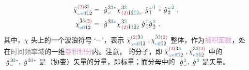 \begin{subequations} \label{eq:chieff}
\begin{align}
	\textcolor{gray}{\widetilde{\textcolor{black}{\chi}}}^{\textcolor{Maroon}{(2)} \hat{3} \textcolor{PineGreen}{\hat{3}}}_{\mathcolor{gray}{\omega} \textcolor{NavyBlue}{\text{eff}} \hat{1} \hat{2}} &= \Xint{{}^{}_{\mathcolor{gray}{-}}}{10}{\hat{g}}^{\;\! \hat{3} \textcolor{PineGreen}{\hat{3}} \textcolor{Plum}{*}}_{\;\! \mathcolor{gray}{\omega}} {\chi}^{\;\! \hat{3} \textcolor{PineGreen}{\hat{3}} }_{\;\! \textcolor{Maroon}{(2)} \hat{1} \hat{2} \textcolor{PineGreen}{\hat{1} \hat{2}} \mathcolor{gray}{\omega}} ~ {\hat{g}}^{\;\! \mathcolor{gray}{\omega} \textcolor{PineGreen}{\hat{1}}}_{\;\! \hat{1}} ~\mathcolor{gray}{\widetilde *}~ {\hat{g}}^{\;\! \mathcolor{gray}{\omega} \textcolor{PineGreen}{\hat{2}}}_{\;\! \hat{2}} ~, \label{eq:chieff-spectrum} \\
	{\chi}^{\hat{3} \textcolor{PineGreen}{\hat{3}} \textcolor{Maroon}{(2)} }_{\textcolor{NavyBlue}{\text{eff}} \hat{1} \hat{2}} &= \Xint{{}^{}_{\mathcolor{gray}{-}}}{10}{\hat{g}}^{\;\! \hat{3} \textcolor{PineGreen}{\hat{3}} \textcolor{Plum}{*}}_{\;\! } {\chi}^{\;\! \hat{3} \textcolor{PineGreen}{\hat{3}} }_{\;\! \textcolor{Maroon}{(2)} \hat{1} \textcolor{PineGreen}{\hat{1}} \hat{2} \textcolor{PineGreen}{\hat{2}}} ~ {\hat{g}}^{\;\! \textcolor{PineGreen}{\hat{1}}}_{\;\! \hat{1}}  {\hat{g}}^{\;\! \textcolor{PineGreen}{\hat{2}}}_{\;\! \hat{2}} ~, \label{eq:chieff-discrete}
\end{align}
\end{subequations}
其中，$\chi$ 头上的一个波浪符号 `$\mathcolor{gray}{\sim}$'，表示 $\textcolor{gray}{\widetilde{\textcolor{black}{\chi}}}^{\textcolor{Maroon}{(2)} \hat{3} \textcolor{PineGreen}{\hat{3}}}_{\mathcolor{gray}{\omega} \textcolor{NavyBlue}{\text{eff}} \hat{1} \hat{2}}~, {\chi}^{\hat{3} \textcolor{PineGreen}{\hat{3}} \textcolor{Maroon}{(2)} }_{\textcolor{NavyBlue}{\text{eff}} \hat{1} \hat{2}}$ 整体，作为\textcolor{Plum}{被积函数}，处在\textcolor{gray}{时间频率域}的一维\textcolor{Plum}{卷积积分}内。注意， 的分子，即 $\textcolor{gray}{\widetilde{\textcolor{black}{\chi}}}^{\textcolor{Maroon}{(2)} \hat{3} \textcolor{PineGreen}{\hat{3}}}_{\mathcolor{gray}{\omega} \textcolor{NavyBlue}{\text{eff}} \hat{1} \hat{2}}~, {\chi}^{\hat{3} \textcolor{PineGreen}{\hat{3}} \textcolor{Maroon}{(2)} }_{\textcolor{NavyBlue}{\text{eff}} \hat{1} \hat{2}}$ 中的 $\Xint{{}^{}_{\mathcolor{gray}{-}}}{10}{\hat{g}}^{\;\! \hat{3} \textcolor{PineGreen}{\hat{3}} \textcolor{Plum}{*}}_{\;\! \mathcolor{gray}{\omega}}, \Xint{{}^{}_{\mathcolor{gray}{-}}}{10}{\hat{g}}^{\;\! \hat{3} \textcolor{PineGreen}{\hat{3}} \textcolor{Plum}{*}}_{\;\! }$ 是（协变）矢量的分量，即标量；而分母中的 $\Xint{{}^{}_{\mathcolor{gray}{-}}}{10}{\hat{g}}^{\;\! \textcolor{PineGreen}{\hat{3}}}_{\;\! \mathcolor{gray}{\omega}}, \Xint{{}^{}_{\mathcolor{gray}{-}}}{10}{\hat{g}}^{\;\! \textcolor{PineGreen}{\hat{3}}}$ 是矢量。

